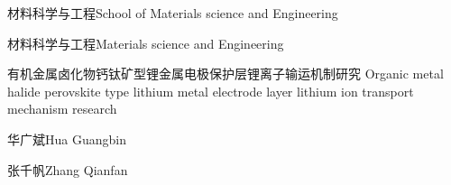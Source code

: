 
\school
{材料科学与工程}{School of Materials science and Engineering}

\major
{材料科学与工程}{Materials science and Engineering}

\thesistitle
{有机金属卤化物钙钛矿型锂金属电极保护层锂离子输运机制研究}
{} %
{Organic metal halide perovskite type lithium metal electrode layer lithium ion transport mechanism research}
{}

\thesisauthor
{华广斌}{Hua Guangbin}

\teacher
{张千帆}{Zhang Qianfan}







